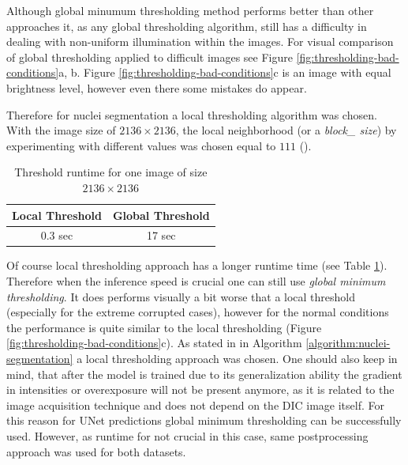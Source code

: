 Although global minumum thresholding method performs better than other approaches it, as any global thresholding algorithm, still has a difficulty in dealing with non-uniform illumination within the images. For visual comparison of global thresholding applied to difficult images see Figure \ref{fig:thresholding-bad-conditions}a, b. Figure \ref{fig:thresholding-bad-conditions}c is an image with equal brightness level, however even there some mistakes do appear.

Therefore for nuclei segmentation a local thresholding algorithm was chosen. With the image size of $2136 \times 2136$, the local neighborhood (or a \textit{block\_ size}) by experimenting with different values was chosen equal to $111$ (\cite{local_thresholding}).

\begin{table}[htb]
    \centering
        \begin{tabular}{||c c||} 
         \hline
         Local Threshold & Global Threshold \\ [0.5ex] 
         \hline\hline
         0.3 sec & 17 sec  \\ 
         \hline
        \end{tabular}
        \caption{Threshold runtime for one image of size $2136 \times 2136$}
        \label{table:threshold-timing}
    \end{table}
    
Of course local thresholding approach has a longer runtime time (see Table \ref{table:threshold-timing}). Therefore when the inference speed is crucial one can still use \textit{global minimum thresholding}. It does performs visually a bit worse that a local threshold (especially for the extreme corrupted cases), however for the normal conditions the performance is quite similar to the local thresholding (Figure \ref{fig:thresholding-bad-conditions}c). As stated in in Algorithm \ref{algorithm:nuclei-segmentation} a local thresholding approach was chosen. One should also keep in mind, that after the model is trained due to its generalization ability the gradient in intensities or overexposure will not be present anymore, as it is related to the image acquisition technique and does not depend on the DIC image itself. For this reason for UNet predictions global minimum thresholding can be successfully used. However, as runtime for not crucial in this case, same postprocessing approach was used for both datasets.
